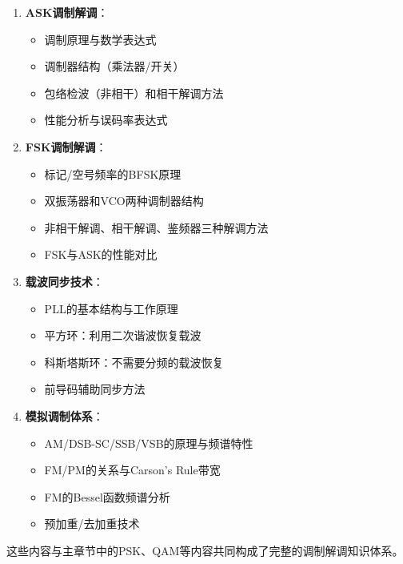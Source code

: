 \begin{enumerate}
    \item \textbf{ASK调制解调}：
    \begin{itemize}
        \item 调制原理与数学表达式
        \item 调制器结构（乘法器/开关）
        \item 包络检波（非相干）和相干解调方法
        \item 性能分析与误码率表达式
    \end{itemize}
    
    \item \textbf{FSK调制解调}：
    \begin{itemize}
        \item 标记/空号频率的BFSK原理
        \item 双振荡器和VCO两种调制器结构
        \item 非相干解调、相干解调、鉴频器三种解调方法
        \item FSK与ASK的性能对比
    \end{itemize}
    
    \item \textbf{载波同步技术}：
    \begin{itemize}
        \item PLL的基本结构与工作原理
        \item 平方环：利用二次谐波恢复载波
        \item 科斯塔斯环：不需要分频的载波恢复
        \item 前导码辅助同步方法
    \end{itemize}
    
    \item \textbf{模拟调制体系}：
    \begin{itemize}
        \item AM/DSB-SC/SSB/VSB的原理与频谱特性
        \item FM/PM的关系与Carson's Rule带宽
        \item FM的Bessel函数频谱分析
        \item 预加重/去加重技术
    \end{itemize}
\end{enumerate}

这些内容与主章节中的PSK、QAM等内容共同构成了完整的调制解调知识体系。
